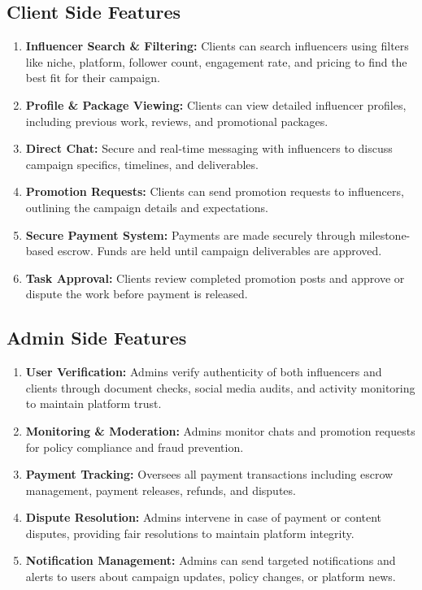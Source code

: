 \begin{justify}
\subsection{Client Side Features}
\begin{enumerate}
    \item \textbf{Influencer Search & Filtering:} Clients can search influencers using filters like niche, platform, follower count, engagement rate, and pricing to find the best fit for their campaign.
    \item 	\textbf{Profile & Package Viewing:} Clients can view detailed influencer profiles, including previous work, reviews, and promotional packages.
    \item 	\textbf{Direct Chat:} Secure and real-time messaging with influencers to discuss campaign specifics, timelines, and deliverables.
    \item 	\textbf{Promotion Requests:} Clients can send promotion requests to influencers, outlining the campaign details and expectations.
    \item 	\textbf{Secure Payment System:} Payments are made securely through milestone-based escrow. Funds are held until campaign deliverables are approved.
    \item 	\textbf{Task Approval:} Clients review completed promotion posts and approve or dispute the work before payment is released.
\end{enumerate}
\subsection{Admin Side Features}
\begin{enumerate}
    \item 	\textbf{User Verification:} Admins verify authenticity of both influencers and clients through document checks, social media audits, and activity monitoring to maintain platform trust.
    \item 	\textbf{Monitoring & Moderation:} Admins monitor chats and promotion requests for policy compliance and fraud prevention.
    \item 	\textbf{Payment Tracking:} Oversees all payment transactions including escrow management, payment releases, refunds, and disputes.
    \item 	\textbf{Dispute Resolution:} Admins intervene in case of payment or content disputes, providing fair resolutions to maintain platform integrity.
    \item 	\textbf{Notification Management:} Admins can send targeted notifications and alerts to users about campaign updates, policy changes, or platform news.
\end{enumerate}

\end{justify}
